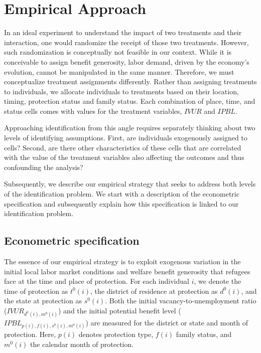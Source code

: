 
\FloatBarrier
\section{Empirical Approach} \label{sec:empirics}

In an ideal experiment to understand the impact of two treatments and their interaction, one would randomize the receipt of those two treatments. However, such randomization is conceptually not feasible in our context. While it is conceivable to assign benefit generosity, labor demand, driven by the economy's evolution, cannot be manipulated in the same manner. Therefore, we must conceptualize treatment assignments differently. Rather than assigning treatments to individuals, we allocate individuals to treatments based on their location, timing, protection status and family status. Each combination of place, time, and status cells comes with values for the treatment variables, $IVUR$ and $IPBL$.

Approaching identification from this angle requires separately thinking about two levels of identifying assumptions. First, are individuals exogenously assigned to cells? Second, are there other characteristics of these cells that are correlated with the value of the treatment variables also affecting the outcomes and thus confounding the analysis?

Subsequently, we describe our empirical strategy that seeks to address both levels of the identification problem. We start with a description of the econometric specification and subsequently explain how this specification is linked to our identification problem.

\subsection{Econometric specification} \label{sec:specification}

The essence of our empirical strategy is to exploit exogenous variation in the initial local labor market conditions and welfare benefit generosity that refugees face at the time and place of protection. For each individual $i$, we denote the time of protection as $t^0(i)$, the district of residence at protection as $d^0(i)$, and the state at protection as $s^0(i)$. Both the initial vacancy-to-unemployment ratio ($IVUR_{d^0(i), m^0(i)}$) and the initial potential benefit level ($IPBL_{p(i), f(i), s^0(i), m^0(i)}$) are measured for the district or state and month of protection. Here, $p(i)$ denotes protection type, $f(i)$ family status, and $m^0(i)$ the calendar month of protection. 

